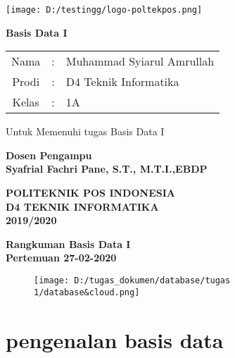 \documentclass[a4paper,12pt]{article}
\begin{document}
        \begin{center}
            \texttt{[image: D:/testingg/logo-poltekpos.png]}
        \end{center}
        \begin{center}
            \textbf{Basis  Data I} \\
        \end{center}
        \vspace{-0.6cm}
        \begin{center}
            \begin{tabular}{ c c l}
                Nama & : & Muhammad Syiarul Amrullah\\
                Prodi & : & D4 Teknik Informatika\\
                Kelas & : & 1A
            \end{tabular}
        \end{center}
        \vspace{0.6cm}
        \begin{center}
            Untuk Memenuhi tugas Basis Data I\\
        \end{center}
        \begin{center}
          \textbf{Dosen Pengampu}\\
          \textbf{Syafrial Fachri Pane, S.T., M.T.I.,EBDP}
        \end{center}
        \vspace{0.5cm}
        \begin{center}
            \textbf{POLITEKNIK POS INDONESIA}\\
            \textbf{D4 TEKNIK INFORMATIKA}\\
            \textbf{2019/2020}
        \end{center}
        \newpage
        \begin{center}
          \huge{\textbf{Rangkuman Basis Data I\\Pertemuan 27-02-2020}} %
        \end{center}
         \begin{figure}
            \centering
            \texttt{[image: D:/tugas\_dokumen/database/tugas 1/database\&cloud.png]}
          \end{figure}
        \section{\textbf{pengenalan basis data}}
\end{document}
